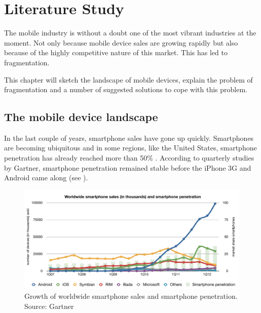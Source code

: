 \chapter{Literature Study}
\label{chap:literature}

\npar The mobile industry is without a doubt one of the most vibrant industries at the moment. Not only because mobile device sales are growing rapidly but also because of the highly competitive nature of this market. This has led to fragmentation. 

\npar This chapter will sketch the landscape of mobile devices, explain the problem of fragmentation and a number of suggested solutions to cope with this problem.

\section{The mobile device landscape}

\npar In the last couple of years, smartphone sales have gone up quickly. Smartphones are becoming ubiquitous and in some regions, like the United States, smartphone penetration has already reached more than 50\% \cite{Nielsen:2012}. According to quarterly studies by Gartner, smartphone penetration remained stable before the iPhone 3G and Android came along (see ).

\begin{figure}
    \begin{center}
        \includegraphics[width=\textwidth]{figs/smartphone_sales.pdf}
        	\caption{
        	    	Growth of worldwide smartphone sales and smartphone penetration. Source: Gartner \citep{Gartner:08Q2,Gartner:08Q3,Gartner:08Q4,Gartner:10Q1,Gartner:10Q2,Gartner:10Q3,Gartner:10Q4,Gartner:11Q1,Gartner:11Q2,Gartner:11Q3,Gartner:11Q4,Gartner:12Q1,Gartner:12Q2}
        	}
        	\label{fig:smartphone_sales}
    \end{center}
\end{figure}

